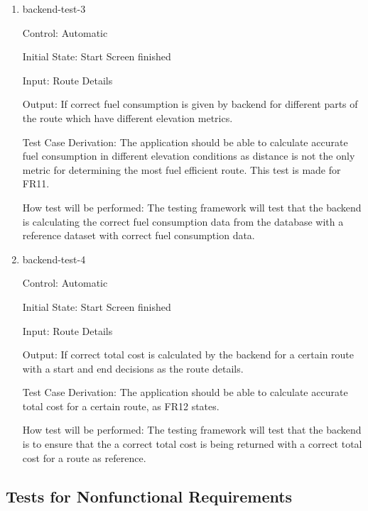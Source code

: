\documentclass[12pt, titlepage]{article}
\begin{document}
\begin{enumerate}
\item{backend-test-3\\}

Control: Automatic
					
Initial State: Start Screen finished
					
Input: Route Details
					
Output: If correct fuel consumption is given by backend for different parts of the route which have different elevation metrics.

Test Case Derivation: The application should be able to calculate accurate fuel consumption in different elevation conditions as 
distance is not the only metric for determining the most fuel efficient route. This test is made for FR11.
					
How test will be performed: The testing framework will test that the backend is calculating the correct fuel consumption data from the database 
with a reference dataset with correct fuel consumption data.
					
\item{backend-test-4\\}

Control: Automatic
					
Initial State: Start Screen finished
					
Input: Route Details
					
Output: If correct total cost is calculated by the backend for a certain route with a start and end decisions as the route details.

Test Case Derivation: The application should be able to calculate accurate total cost for a certain route, as FR12 states.
					
How test will be performed: The testing framework will test that the backend is to ensure that the a correct total cost is being returned 
with a correct total cost for a route as reference.

\end{enumerate}

\subsection{Tests for Nonfunctional Requirements} \label{NFR}

\end{document}

